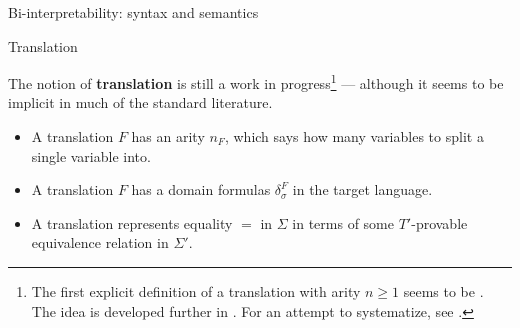 \documentclass[ignorenonframetext,fleqn]{beamer}
\newcommand{\2}{\mathcal}
\begin{document}
\begin{frame}{Bi-interpretability: syntax and semantics}

  \begin{center}
  \end{center}

\end{frame}

\begin{frame}{Translation}

  The notion of \textbf{translation} is still a work in
  progress\footnote{The first explicit definition of a translation
    with arity $n\geq 1$ seems to be \citep{szczerba}. The idea is
    developed further in \citep{benthem,visser2006}. For an attempt to
    systematize, see \citep{halvorson}.} --- although it seems to be
  implicit in much of the standard literature.

  \begin{itemize}
  \item A translation $F$ has an arity $n_F$, which says how many
    variables to split a single variable into.
  \item A translation $F$ has a domain formulas $\delta ^F_\sigma$ in
    the target language.
  \item A translation represents equality $=$ in $\Sigma$ in terms of
    some $T'$-provable equivalence relation in $\Sigma '$.
  \end{itemize}



\end{frame}
\end{document}
